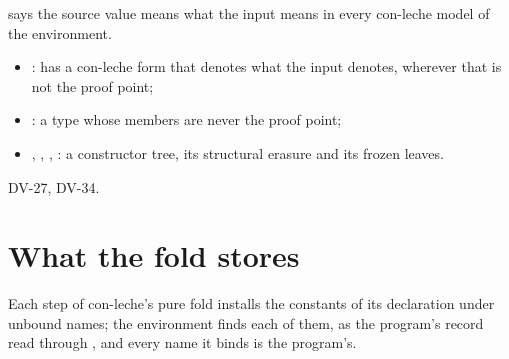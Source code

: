\begin{definition}
  \label{def:EraseProof-Sound}
  \leanok
    says the source value means what the input means in every con-leche model of the environment.
  \begin{itemize}
  \item {}:  has a con-leche form that denotes what the input denotes, wherever that is not the proof point;
  \item {}: a type whose members are never the proof point;
  \item {}, , , : a constructor tree, its structural erasure and its frozen leaves.
  \end{itemize}
   DV-27, DV-34.
\end{definition}

\section{What the fold stores}\label{sec:bridge-store}

Each step of con-leche's pure fold installs the constants of its declaration under unbound names; the environment finds each of them, as the program's record read through , and every name it binds is the program's.

